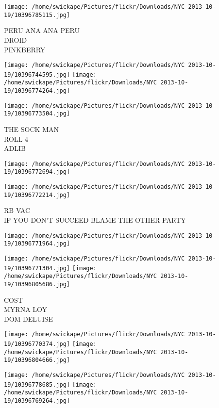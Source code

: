 \documentclass[10pt,letterpaper]{article}
\begin{document}
\vspace{0.25in}
\texttt{[image: /home/swickape/Pictures/flickr/Downloads/NYC 2013-10-19/10396785115.jpg]}

PERU ANA ANA PERU\\
DROID\\
PINKBERRY\\
\pagebreak

\texttt{[image: /home/swickape/Pictures/flickr/Downloads/NYC 2013-10-19/10396744595.jpg]}
\texttt{[image: /home/swickape/Pictures/flickr/Downloads/NYC 2013-10-19/10396774264.jpg]}

\texttt{[image: /home/swickape/Pictures/flickr/Downloads/NYC 2013-10-19/10396773504.jpg]}

THE SOCK MAN\\
ROLL 4\\
ADLIB\\
\pagebreak

\texttt{[image: /home/swickape/Pictures/flickr/Downloads/NYC 2013-10-19/10396772694.jpg]}

\vspace{0.25in}
\texttt{[image: /home/swickape/Pictures/flickr/Downloads/NYC 2013-10-19/10396772214.jpg]}

RB VAC\\
IF YOU DON'T SUCCEED BLAME THE OTHER PARTY\\
\pagebreak

\texttt{[image: /home/swickape/Pictures/flickr/Downloads/NYC 2013-10-19/10396771964.jpg]}

\vspace{0.25in}
\texttt{[image: /home/swickape/Pictures/flickr/Downloads/NYC 2013-10-19/10396771304.jpg]}
\texttt{[image: /home/swickape/Pictures/flickr/Downloads/NYC 2013-10-19/10396805686.jpg]}

COST\\
MYRNA LOY\\
DOM DELUISE\\
\pagebreak

\texttt{[image: /home/swickape/Pictures/flickr/Downloads/NYC 2013-10-19/10396770374.jpg]}
\texttt{[image: /home/swickape/Pictures/flickr/Downloads/NYC 2013-10-19/10396804666.jpg]}

\texttt{[image: /home/swickape/Pictures/flickr/Downloads/NYC 2013-10-19/10396778685.jpg]}
\texttt{[image: /home/swickape/Pictures/flickr/Downloads/NYC 2013-10-19/10396769264.jpg]}
\end{document}
